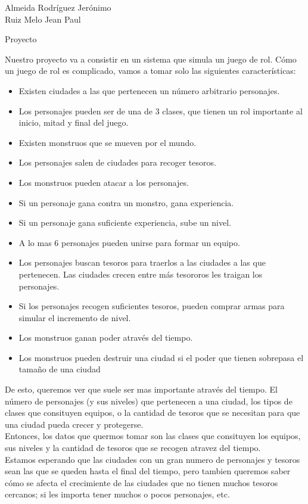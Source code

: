\documentclass[a4paper, 12pt]{report}
\begin{document}
\begin{flushright}
    Almeida Rodríguez Jerónimo\\
    Ruiz Melo Jean Paul
\end{flushright}

\begin{center}
    {\LARGE Proyecto}\\
\end{center}
Nuestro proyecto va a consistir en un sistema que simula un juego de rol.
Cómo un juego de rol es complicado, vamos a tomar solo las siguientes
características:
\begin{itemize}
    \item Existen ciudades a las que pertenecen un número
    arbitrario personajes.
    \item Los personajes pueden ser de una de 3 clases, que
    tienen un rol importante al inicio, mitad y final del
    juego.
    \item Existen monstruos que se mueven por el mundo.
    \item Los personajes salen de ciudades para recoger tesoros.
    \item Los monstruos pueden atacar a los personajes.
    \item Si un personaje gana contra un monstro, gana
    experiencia.
    \item Si un personaje gana suficiente experiencia, sube un nivel.
    \item A lo mas 6 personajes pueden unirse para formar un equipo.
    \item Los personajes buscan tesoros para traerlos a las
    ciudades a las que pertenecen. Las ciudades crecen entre más
    tesororos les traigan los personajes.
    \item Si los personajes recogen suficientes tesoros, pueden
    comprar armas para simular el incremento de nivel.
    \item Los monstruos ganan poder através del tiempo.
    \item Los monstruos pueden destruir una ciudad si el
    poder que tienen sobrepasa el tamaño de una ciudad
\end{itemize}
De esto, queremos ver que suele ser mas importante através del tiempo.
El número de personajes (y sus niveles) que pertenecen a una ciudad, los
tipos de clases que consituyen equipos, o la cantidad de tesoros que
se necesitan para que una ciudad pueda crecer y protegerse. \\

Entonces, los datos que quermos tomar son las clases que
consituyen los equipos, sus niveles y la cantidad de tesoros
que se recogen atravez del tiempo. \\

Estamos esperando que las ciudades con un gran numero de
personajes y tesoros sean las que se queden hasta el final
del tiempo, pero tambien queremos saber cómo se afecta el crecimiente de
las ciudades que no tienen muchos tesoros cercanos; si les importa tener muchos
o pocos personajes, etc.
\end{document}
